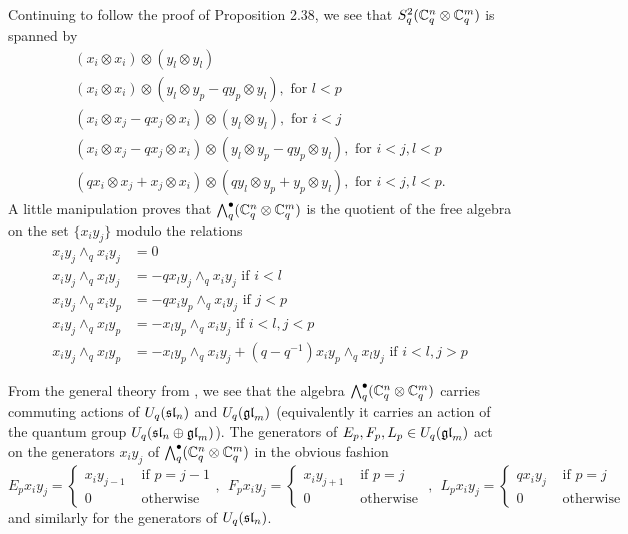 \documentclass[10pt,leqno]{article}
\begin{document}
Continuing to follow the proof of Proposition 2.38, we see that $ S^2_q (\bC_q^n \otimes \bC_q^m) $ is spanned by
\begin{gather*}
(x_i \otimes x_i) \otimes (y_l \otimes y_l) \\
(x_i \otimes x_i) \otimes (y_l \otimes y_p - q y_p \otimes y_l), \text{ for } l < p \\
(x_i \otimes x_j - q x_j \otimes x_i) \otimes (y_l \otimes y_l), \text{ for } i < j \\
(x_i \otimes x_j - q x_j \otimes x_i) \otimes (y_l \otimes y_p - q y_p \otimes y_l), \text{ for } i < j, l < p \\
(q x_i \otimes x_j +  x_j \otimes x_i) \otimes (q y_l \otimes y_p +  y_p \otimes y_l), \text{ for } i < j, l < p.
\end{gather*}
A little manipulation proves that $ \Alt^\bullet_q(\bC_q^n \otimes \bC_q^m) $ is the quotient of the free algebra on the set $ \{ x_i y_j \} $ modulo the relations
\begin{align*}
x_iy_j \wedge_q x_i y_j &= 0 \\
x_iy_j \wedge_q x_l y_j &= - q x_l y_j \wedge_q x_i y_j  \text{ if } i < l \\
x_i y_j \wedge_q x_i y_p &= - q x_i y_p \wedge_q x_i y_j \text{ if } j < p \\
x_i y_j \wedge_q x_l y_p &= -x_l y_p \wedge_q x_i y_j \text{ if  } i < l, j < p \\
x_i y_j \wedge_q x_l y_p &= -x_l y_p \wedge_q x_i y_j + (q - q^{-1}) x_i y_p \wedge_q x_l y_j \text{ if } i < l, j > p 
\end{align*}

From the general theory from \cite{BZ}, we see that the algebra $ \Alt^\bullet_q(\bC_q^n \otimes \bC_q^m) $ carries commuting actions of $ U_q(\sl_n) $ and $ U_q(\gl_m) $ (equivalently it carries an action of the quantum group $ U_q(\sl_n \oplus \gl_m) $).  The generators of $E_p, F_p, L_p \in U_q(\gl_m) $ act on the generators $ x_i y_j $ of $\Alt^\bullet_q(\bC_q^n \otimes \bC_q^m) $ in the obvious fashion
$$ E_p x_i y_j = \begin{cases} x_i y_{j-1} & \text{ if } p = j-1  \\
 0 & \text{  otherwise }
 \end{cases}, \ \ 
F_p x_i y_j = \begin{cases} x_i y_{j+1} & \text{ if } p = j \\
 0 & \text{ otherwise }
 \end{cases}, \ \ 
L_p x_i y_j = \begin{cases} q x_i y_j & \text{ if } p = j \\
0 & \text{ otherwise }
\end{cases}$$
and similarly for the generators of $ U_q(\sl_n) $.
\end{document}
